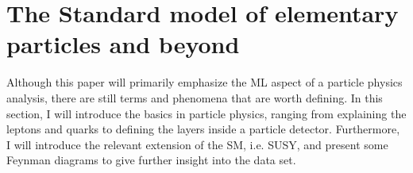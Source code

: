 \chapter{The Standard model of elementary particles and beyond}
Although this paper will primarily emphasize the \ac{ML} aspect of a particle physics analysis, there are still terms and phenomena that are worth defining.
In this section, I will introduce the basics in particle physics, ranging from explaining the leptons and quarks to defining the layers inside a 
particle detector. Furthermore, I will introduce the relevant extension of the \ac{SM}, i.e. \ac{SUSY}, and present some Feynman diagrams 
to give further insight into the data set.